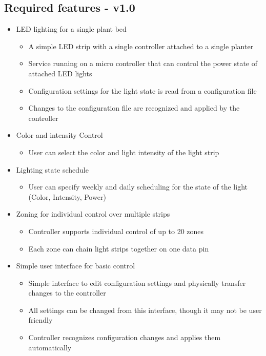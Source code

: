 \documentclass[onecolumn, draftclsnofoot,10pt, compsoc]{IEEEtran}
\begin{document}
		\subsection*{Required features - v1.0}
		\begin{itemize}
			\item LED lighting for a single plant bed
			\begin{itemize}
				\item A simple LED strip with a single controller attached to a single planter
				\item Service running on a micro controller that can control the power state of attached LED lights
				\item Configuration settings for the light state is read from a configuration file
				\item Changes to the configuration file are recognized and applied by the controller
			\end{itemize}
			\item Color and intensity Control
				\begin{itemize}
					\item User can select the color and light intensity of the light strip
				\end{itemize}
			\item Lighting state schedule
				\begin{itemize}
					\item User can specify weekly and daily scheduling for the state of the light (Color, Intensity, Power)
				\end{itemize}
			\item Zoning for individual control over multiple strips
				\begin{itemize}
					\item Controller supports individual control of up to 20 zones
					\item Each zone can chain light strips together on one data pin
				\end{itemize}
			\item Simple user interface for basic control
				\begin{itemize}
					\item Simple interface to edit configuration settings and physically transfer changes to the controller
					\item All settings can be changed from this interface, though it may not be user friendly
					\item Controller recognizes configuration changes and applies them automatically
				\end{itemize}
		\end{itemize}
\end{document}

